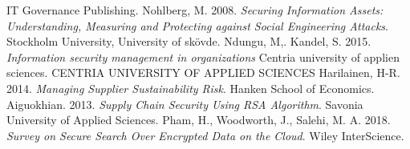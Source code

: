 \documentclass{article}
\begin{document}
\begin{thebibliography}{9}
        IT Governance Publishing.
	Nohlberg, M.
	2008.
	\textit{Securing Information Assets: Understanding, Measuring and Protecting against Social Engineering Attacks}.
	Stockholm University,
	University of skövde.
	Ndungu, M,.
	Kandel, S.
	2015.
	\textit{Information security management in organizations}
	Centria university of applien sciences.
	CENTRIA UNIVERSITY OF APPLIED SCIENCES
	Harilainen, H-R.
	2014.
	\textit{Managing Supplier Sustainability Risk}.
	Hanken School of Economics.
	Aiguokhian.
	2013.
	\textit{Supply Chain Security Using RSA Algorithm}.
	Savonia University of Applied Sciences.
	Pham, H.,
	Woodworth, J.,
	Salehi, M. A.
	2018.
	\textit{Survey on Secure Search Over Encrypted Data on the Cloud}.
	Wiley InterScience.
\end{thebibliography}
\end{document}
